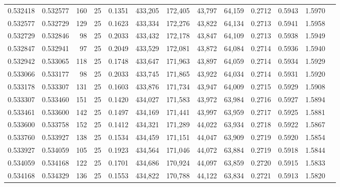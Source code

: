 \begin{tabular}{rrrrrrrrrrrrr}
0.532418 & 0.532577 &   160 &  25 &                                     0.1351 & 433,205 & 172,405 &  43,797 &  64,159 & 0.2712 & 0.5943 & 1.5970 \\
0.532577 & 0.532729 &   129 &  25 &                                     0.1623 & 433,334 & 172,276 &  43,822 &  64,134 & 0.2713 & 0.5941 & 1.5958 \\
0.532729 & 0.532846 &    98 &  25 &                                     0.2033 & 433,432 & 172,178 &  43,847 &  64,109 & 0.2713 & 0.5938 & 1.5949 \\
0.532847 & 0.532941 &    97 &  25 &                                     0.2049 & 433,529 & 172,081 &  43,872 &  64,084 & 0.2714 & 0.5936 & 1.5940 \\
0.532942 & 0.533065 &   118 &  25 &                                     0.1748 & 433,647 & 171,963 &  43,897 &  64,059 & 0.2714 & 0.5934 & 1.5929 \\
0.533066 & 0.533177 &    98 &  25 &                                     0.2033 & 433,745 & 171,865 &  43,922 &  64,034 & 0.2714 & 0.5931 & 1.5920 \\
0.533178 & 0.533307 &   131 &  25 &                                     0.1603 & 433,876 & 171,734 &  43,947 &  64,009 & 0.2715 & 0.5929 & 1.5908 \\
0.533307 & 0.533460 &   151 &  25 &                                     0.1420 & 434,027 & 171,583 &  43,972 &  63,984 & 0.2716 & 0.5927 & 1.5894 \\
0.533461 & 0.533600 &   142 &  25 &                                     0.1497 & 434,169 & 171,441 &  43,997 &  63,959 & 0.2717 & 0.5925 & 1.5881 \\
0.533600 & 0.533758 &   152 &  25 &                                     0.1412 & 434,321 & 171,289 &  44,022 &  63,934 & 0.2718 & 0.5922 & 1.5867 \\
0.533760 & 0.533927 &   138 &  25 &                                     0.1534 & 434,459 & 171,151 &  44,047 &  63,909 & 0.2719 & 0.5920 & 1.5854 \\
0.533927 & 0.534059 &   105 &  25 &                                     0.1923 & 434,564 & 171,046 &  44,072 &  63,884 & 0.2719 & 0.5918 & 1.5844 \\
0.534059 & 0.534168 &   122 &  25 &                                     0.1701 & 434,686 & 170,924 &  44,097 &  63,859 & 0.2720 & 0.5915 & 1.5833 \\
0.534168 & 0.534329 &   136 &  25 &                                     0.1553 & 434,822 & 170,788 &  44,122 &  63,834 & 0.2721 & 0.5913 & 1.5820 \\

\end{tabular}
